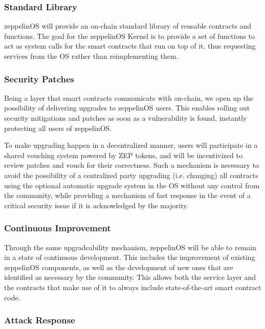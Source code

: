 \documentclass[]{article}
\makeatletter
\DeclareRobustCommand{\_}{%
  \leavevmode\vbox{%
    \hrule\@width.5em
          \@height-.26ex
          \@depth\dimexpr.26ex+.28pt\relax}}
\makeatother
\begin{document}
\subsubsection{Standard Library}

zeppelinOS will provide an on-chain standard library of reusable
contracts and functions. The goal for the zeppelinOS Kernel is to
provide a set of functions to act as system calls for the smart
contracts that run on top of it, thus requesting services from the OS
rather than reimplementing them.

\subsubsection{Security Patches}

Being a layer that smart contracts communicate with on-chain, we open
up the possibility of delivering upgrades to zeppelinOS users. This
enables rolling out security mitigations and patches as soon as a
vulnerability is found, instantly protecting all users of zeppelinOS.

To make upgrading happen in a decentralized manner, users will
participate in a shared vouching system powered by ZEP tokens, and
will be incentivized to review patches and vouch for their
correctness. Such a mechanism is necessary to avoid the possibility of
a centralized party upgrading (i.e. changing) all contracts using the
optional automatic upgrade system in the OS without any control from
the community, while providing a mechanism of fast response in the event
of a critical security issue if it is acknowledged by the majority.

\subsubsection{Continuous Improvement}

Through the same upgradeability mechanism, zeppelinOS will be able
to remain in a state of continuous development. This includes the
improvement of existing zeppelinOS components, as well as the
development of new ones that are identified as necessary by the
community. This allows both the service layer and the contracts that
make use of it to always include state-of-the-art smart contract code.

\subsubsection{Attack Response}
\end{document}
